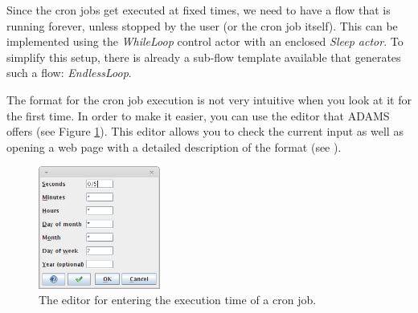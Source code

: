 \documentclass[a4paper]{book}
\begin{document}
Since the cron jobs get executed at fixed times, we need to have a flow that is
running forever, unless stopped by the user (or the cron job itself). This can 
be implemented using the \textit{WhileLoop} control actor with an enclosed 
\textit{Sleep actor}. To simplify this setup, there is already a sub-flow 
template available that generates such a flow: \textit{EndlessLoop}.

The format for the cron job execution is not very intuitive when you look at it
for the first time. In order to make it easier, you can use the editor that ADAMS
offers (see Figure \ref{cron-editor}). This editor allows you to check the
current input as well as opening a web page with a detailed description of
the format (see \cite{cronformat}).

\begin{figure}[htb]
  \centering
  \includegraphics[width=4.0cm]{images/cron-editor.png}
  \caption{The editor for entering the execution time of a cron job.}
  \label{cron-editor}
\end{figure}


\end{document}
